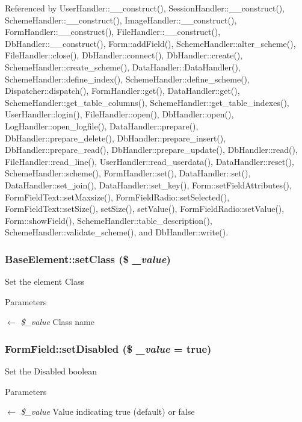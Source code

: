 Referenced by UserHandler::\_\-\_\-construct(), SessionHandler::\_\-\_\-construct(), SchemeHandler::\_\-\_\-construct(), ImageHandler::\_\-\_\-construct(), FormHandler::\_\-\_\-construct(), FileHandler::\_\-\_\-construct(), DbHandler::\_\-\_\-construct(), Form::addField(), SchemeHandler::alter\_\-scheme(), FileHandler::close(), DbHandler::connect(), DbHandler::create(), SchemeHandler::create\_\-scheme(), DataHandler::DataHandler(), SchemeHandler::define\_\-index(), SchemeHandler::define\_\-scheme(), Dispatcher::dispatch(), FormHandler::get(), DataHandler::get(), SchemeHandler::get\_\-table\_\-columns(), SchemeHandler::get\_\-table\_\-indexes(), UserHandler::login(), FileHandler::open(), DbHandler::open(), LogHandler::open\_\-logfile(), DataHandler::prepare(), DbHandler::prepare\_\-delete(), DbHandler::prepare\_\-insert(), DbHandler::prepare\_\-read(), DbHandler::prepare\_\-update(), DbHandler::read(), FileHandler::read\_\-line(), UserHandler::read\_\-userdata(), DataHandler::reset(), SchemeHandler::scheme(), FormHandler::set(), DataHandler::set(), DataHandler::set\_\-join(), DataHandler::set\_\-key(), Form::setFieldAttributes(), FormFieldText::setMaxsize(), FormFieldRadio::setSelected(), FormFieldText::setSize(), setSize(), setValue(), FormFieldRadio::setValue(), Form::showField(), SchemeHandler::table\_\-description(), SchemeHandler::validate\_\-scheme(), and DbHandler::write().

\subsubsection[{setClass}]{\setlength{\rightskip}{0pt plus 5cm}BaseElement::setClass (\$ {\em \_\-value})}\label{classBaseElement_af6597b30fa9798878f6290271043dfa2}
Set the element Class 
\begin{DoxyParams}{Parameters}
\item[\mbox{$\leftarrow$} {\em \$\_\-value}]Class name \end{DoxyParams}
\subsubsection[{setDisabled}]{\setlength{\rightskip}{0pt plus 5cm}FormField::setDisabled (\$ {\em \_\-value} = {\ttfamily true})}\label{classFormField_a9fa2c828eaf98154edfaa2e755657117}
Set the Disabled boolean 
\begin{DoxyParams}{Parameters}
\item[\mbox{$\leftarrow$} {\em \$\_\-value}]Value indicating true (default) or false \end{DoxyParams}
